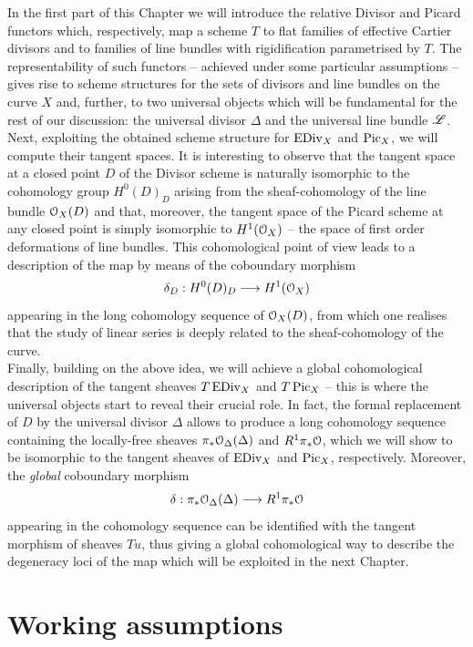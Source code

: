In the first part of this Chapter we will introduce the relative Divisor and Picard functors which, respectively, map a scheme $T$ to flat families of effective Cartier divisors and to families of line bundles with rigidification parametrised by $T$. 
The representability of such functors -- achieved under some particular assumptions -- gives rise to scheme structures for the sets of divisors and line bundles on the curve $X$ and, further, to two universal objects which will be fundamental for the rest of our discussion: the universal divisor $\Delta$ and the universal line bundle $\mathscr{L}$.\\
Next, exploiting the obtained scheme structure for $\operatorname{EDiv}_X$ and $\operatorname{Pic}_X$, we will compute their tangent spaces. 
It is interesting to observe that the tangent space at a closed point $D$ of the Divisor scheme is naturally isomorphic to the cohomology group $H^0(D)_D$ arising from the sheaf-cohomology of the line bundle $\mathcal{O}_X(D)$ and that, moreover, the tangent space of the Picard scheme at any closed point is simply isomorphic to $H^1(\mathcal{O}_X)$ -- the space of first order deformations of line bundles.
This cohomological point of view leads to a description of the \AJJ map by means of the coboundary morphism 
$$ \delta_D : H^0(D)_D \longrightarrow H^1(\mathcal{O}_X) $$
appearing in the long cohomology sequence of $\mathcal{O}_X(D)$, from which one realises that the study of linear series is deeply related to the sheaf-cohomology of the curve.\\
Finally, building on the above idea, we will achieve a global cohomological description of the tangent sheaves $T\operatorname{EDiv}_X$ and $T\operatorname{Pic}_X$ --
this is where the universal objects start to reveal their crucial role. In fact, the formal replacement of $D$ by the universal divisor $\Delta$ allows to produce a long cohomology sequence containing the locally-free sheaves $\pi_* \mathcal{O}_{\Delta}(\Delta)$ and $R^1 \pi_* \mathcal{O}$, which we will show to be isomorphic to the tangent sheaves of $\operatorname{EDiv}_X$ and $\operatorname{Pic}_X$, respectively. 
Moreover, the \emph{global} coboundary morphism 
$$ \delta: \pi_* \mathcal{O}_{\Delta}(\Delta) \longrightarrow R^1 \pi_* \mathcal{O} $$
appearing in the cohomology sequence can be identified with the tangent morphism of sheaves $Tu$, thus giving a global cohomological way to describe the degeneracy loci of the \AJJ map which will be exploited in the next Chapter. 

\section{Working assumptions}\label{sec:assumptions}
	
